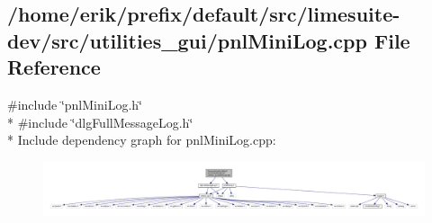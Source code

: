 \subsection{/home/erik/prefix/default/src/limesuite-\/dev/src/utilities\+\_\+gui/pnl\+Mini\+Log.cpp File Reference}
\label{pnlMiniLog_8cpp}
{\ttfamily \#include \char`\"{}pnl\+Mini\+Log.\+h\char`\"{}}\\*
{\ttfamily \#include \char`\"{}dlg\+Full\+Message\+Log.\+h\char`\"{}}\\*
Include dependency graph for pnl\+Mini\+Log.\+cpp\+:
\nopagebreak
\begin{figure}[H]
\begin{center}
\leavevmode
\includegraphics[width=350pt]{df/dc6/pnlMiniLog_8cpp__incl}
\end{center}
\end{figure}
